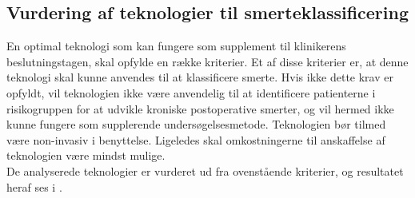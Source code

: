 \subsection{Vurdering af teknologier til smerteklassificering}
En optimal teknologi som kan fungere som supplement til klinikerens beslutningstagen, skal opfylde en række kriterier. Et af disse kriterier er, at denne teknologi skal kunne anvendes til at klassificere smerte. Hvis ikke dette krav er opfyldt, vil teknologien ikke være anvendelig til at identificere patienterne i risikogruppen for at udvikle kroniske postoperative smerter, og vil hermed ikke kunne fungere som supplerende undersøgelsesmetode. Teknologien bør tilmed være non-invasiv i benyttelse. Ligeledes skal omkostningerne til anskaffelse af teknologien være mindst mulige.\\
De analyserede teknologier er vurderet ud fra ovenstående kriterier, og resultatet heraf ses i .

